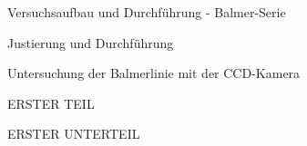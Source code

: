 \documentclass[pdftex, a4paper,11pt, twoside, ngerman]{report}
\begin{document}
\begin{chapter}{Versuchsaufbau und Durchführung - Balmer-Serie}
\begin{section}{Justierung und Durchführung}
\begin{subsection}{Untersuchung der Balmerlinie mit der CCD-Kamera}

      \end{subsection}

      \end{section}

  \end{chapter}
  
  
  \begin{appendix}
    \label{Anhang}
    
    
    
    \begin{chapter}{ERSTER TEIL}
      \label{Anhang:chp:ERSTERTEIL}
      
      
      
      \begin{section}{ERSTER UNTERTEIL}
	\label{Anhang:chp:ERSTERTEIL:sec:UNTERTEIL}
       
       
       
      \end{section}
      
      
    \end{chapter}
    
  \end{appendix}
  
  
  
\end{document}
